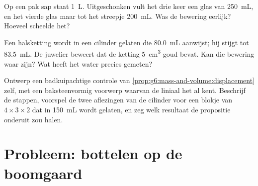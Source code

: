 \begin{exercise}[$\star\star$]\label{exo:g6:mass-and-volume:10}
Op een pak sap staat \qty{1}{L}. Uitgeschonken vult het drie keer een
glas van \qty{250}{mL}, en het vierde glas maar tot het streepje
\qty{200}{mL}. Was de bewering eerlijk? Hoeveel scheelde het?
\end{exercise}

\begin{exercise}[$\star\star$]\label{exo:g6:mass-and-volume:11}
Een halsketting wordt in een cilinder gelaten die \qty{80.0}{mL}
aanwijst; hij stijgt tot \qty{83.5}{mL}. De juwelier beweert dat de
ketting \qty{5}{cm^3} goud bevat. Kan die bewering waar zijn? Wat
heeft het water precies gemeten?
\end{exercise}

\begin{exercise}[$\star\star\star$]\label{exo:g6:mass-and-volume:12}
Ontwerp een badkuipachtige controle van
\cref{prop:g6:mass-and-volume:displacement} zelf, met een
baksteenvormig voorwerp waarvan de liniaal het  al kent.
Beschrijf de stappen, voorspel de twee aflezingen van de cilinder voor
een blokje van $4 \times 3 \times 2$  dat in
\qty{150}{mL} wordt gelaten, en zeg welk resultaat de propositie
onderuit zou halen.
\end{exercise}

\section{Probleem: bottelen op de boomgaard}

